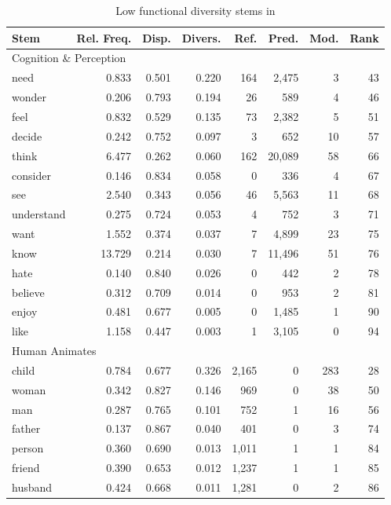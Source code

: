 \begin{table}
  \centering
  \caption{Low functional diversity stems in }
  \label{tab:English-low-functional-diversity}
  \begin{tabular}{ l r r r r r r r }
    \toprule
    Stem & Rel. Freq. & Disp. & Divers. & Ref. & Pred. & Mod. & Rank\\

    \midrule
    \multicolumn{6}{l}{Cognition \& Perception}\\
    \midrule
    need       &  0.833 & 0.501 & 0.220 & 164 &  2,475 &  3 & 43\\
    wonder     &  0.206 & 0.793 & 0.194 &  26 &    589 &  4 & 46\\
    feel       &  0.832 & 0.529 & 0.135 &  73 &  2,382 &  5 & 51\\
    decide     &  0.242 & 0.752 & 0.097 &   3 &    652 & 10 & 57\\
    think      &  6.477 & 0.262 & 0.060 & 162 & 20,089 & 58 & 66\\
    consider   &  0.146 & 0.834 & 0.058 &   0 &    336 &  4 & 67\\
    see        &  2.540 & 0.343 & 0.056 &  46 &  5,563 & 11 & 68\\
    understand &  0.275 & 0.724 & 0.053 &   4 &    752 &  3 & 71\\
    want       &  1.552 & 0.374 & 0.037 &   7 &  4,899 & 23 & 75\\
    know       & 13.729 & 0.214 & 0.030 &   7 & 11,496 & 51 & 76\\
    hate       &  0.140 & 0.840 & 0.026 &   0 &    442 &  2 & 78\\
    believe    &  0.312 & 0.709 & 0.014 &   0 &    953 &  2 & 81\\
    enjoy      &  0.481 & 0.677 & 0.005 &   0 &  1,485 &  1 & 90\\
    like       &  1.158 & 0.447 & 0.003 &   1 &  3,105 &  0 & 94\\

    \midrule
    \multicolumn{6}{l}{Human Animates}\\
    \midrule
    child   & 0.784 & 0.677 & 0.326 & 2,165 & 0 & 283 & 28\\
    woman   & 0.342 & 0.827 & 0.146 &   969 & 0 &  38 & 50\\
    man     & 0.287 & 0.765 & 0.101 &   752 & 1 &  16 & 56\\
    father  & 0.137 & 0.867 & 0.040 &   401 & 0 &   3 & 74\\
    person  & 0.360 & 0.690 & 0.013 & 1,011 & 1 &   1 & 84\\
    friend  & 0.390 & 0.653 & 0.012 & 1,237 & 1 &   1 & 85\\
    husband & 0.424 & 0.668 & 0.011 & 1,281 & 0 &   2 & 86\\


\end{tabular}
\end{table}
